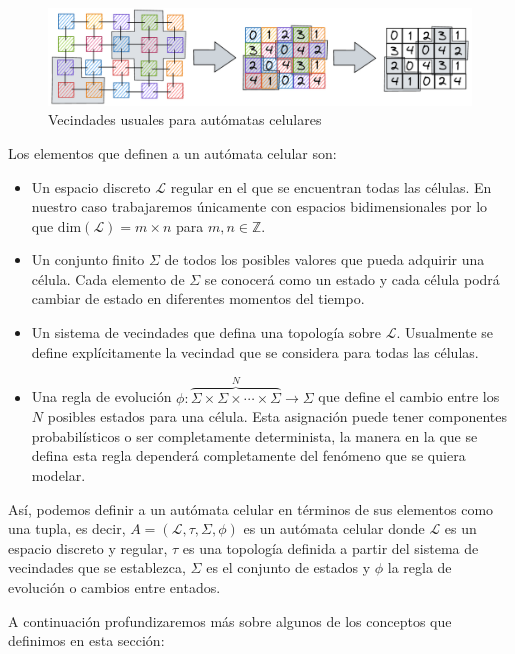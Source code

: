 \begin{figure}[h]
  \centering
    \includegraphics[width=1\textwidth]{Imagenes/ACaMatriz.PNG}
  \caption{Vecindades usuales para autómatas celulares}
  \label{fig:AC a matriz}
\end{figure}

Los elementos que definen a un autómata celular son:

\begin{itemize}
    \item Un espacio discreto $\mathcal{L}$ regular en el que se encuentran todas las células. En nuestro caso trabajaremos únicamente con espacios bidimensionales por lo que $\text{dim}(\mathcal{L})=m\times n$ para $m,n\in\mathbb{Z}$.
    \item Un conjunto finito $\Sigma$ de todos los posibles valores que pueda adquirir una célula. Cada elemento de $\Sigma$ se conocerá como un estado y cada célula podrá cambiar de estado en diferentes momentos del tiempo.
    \item Un sistema de vecindades que defina una topología sobre $\mathcal{L}$. Usualmente se define explícitamente la vecindad que se considera para todas las células.
    \item Una regla de evolución $\phi:\overbrace{\Sigma\times\Sigma\times\cdots\times\Sigma}^{N}\to\Sigma$ que define el cambio entre los $N$ posibles estados para una célula. Esta asignación puede tener componentes probabilísticos o ser completamente determinista, la manera en la que se defina esta regla dependerá completamente del fenómeno que se quiera modelar.
\end{itemize}

Así, podemos definir a un autómata celular en términos de sus elementos como una tupla, es decir, $A = (\mathcal{L}, \tau, \Sigma, \phi)$ es un autómata celular donde $\mathcal{L}$ es un espacio discreto y regular, $\tau$ es una topología definida a partir del sistema de vecindades que se establezca, $\Sigma$ es el conjunto de estados y $\phi$ la regla de evolución o cambios entre entados.

A continuación profundizaremos más sobre algunos de los conceptos que definimos en esta sección:

